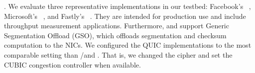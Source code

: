 
\textbf{\quic}.
We evaluate three representative \quic implementations in our testbed: 
Facebook's \mvfst~\cite{mvfst-github,Joras_mvfst}, Microsoft's
\msquic~\cite{msquic-github}, and Fastly's \quicly~\cite{quicly-github}. They
are intended for production use and
include throughput measurement applications.
Furthermore, \mvfst and \quicly support Generic Segmentation Offload (GSO), 
which
offloads \udp segmentation and checksum computation to the NICs. 
We configured the QUIC implementations to the most comparable setting than 
\tls/\tcp and \tcpls. That is, we changed the cipher and set the CUBIC 
congestion controller when available.

